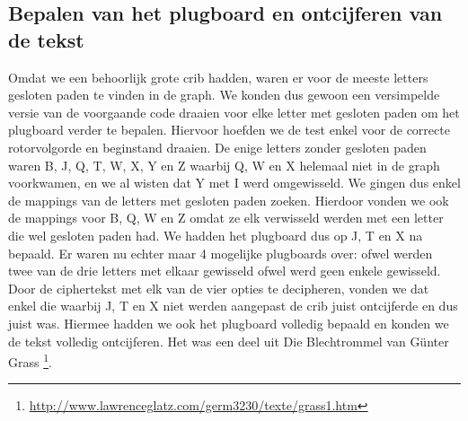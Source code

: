 \subsection{Bepalen van het plugboard en ontcijferen van de tekst}
Omdat we een behoorlijk grote crib hadden, waren er voor de meeste letters gesloten paden te vinden in de graph. We konden dus gewoon een versimpelde versie van de voorgaande code draaien voor elke letter met gesloten paden om het plugboard verder te bepalen. Hiervoor hoefden we de test enkel voor de correcte rotorvolgorde en beginstand draaien. De enige letters zonder gesloten paden waren B, J, Q, T, W, X, Y en Z waarbij Q, W en X helemaal niet in de graph voorkwamen, en we al wisten dat Y met I werd omgewisseld. We gingen dus enkel de mappings van de letters met gesloten paden zoeken. Hierdoor vonden we ook de mappings voor B, Q, W en Z omdat ze elk verwisseld werden met een letter die wel gesloten paden had. We hadden het plugboard dus op J, T en X na bepaald. Er waren nu echter maar 4 mogelijke plugboards over: ofwel werden twee van de drie letters met elkaar gewisseld ofwel werd geen enkele gewisseld. Door de ciphertekst met elk van de vier opties te decipheren, vonden we dat enkel die waarbij J, T en X niet werden aangepast de crib juist ontcijferde en dus juist was. Hiermee hadden we ook het plugboard volledig bepaald en konden we de tekst volledig ontcijferen. Het was een deel uit Die Blechtrommel van G\"unter Grass \footnote{\url{http://www.lawrenceglatz.com/germ3230/texte/grass1.htm}}.



